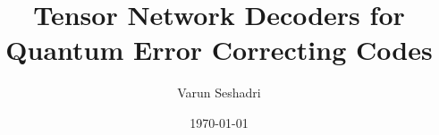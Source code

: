\documentclass[11pt, twoside]{report}
\theoremstyle{definition}
\theoremstyle{plain}
\begin{document}
\begin{titlepage}
    \title{Tensor Network Decoders for Quantum Error Correcting Codes}
    \author{Varun Seshadri}
    \date{\today}
\end{titlepage}
\maketitle
% 

\newpage
\tableofcontents
\listoftodos{}







\newpage
\nocite{*}
\printbibliography[title=\refname]

\restoregeometry
\newpage


\end{document}
